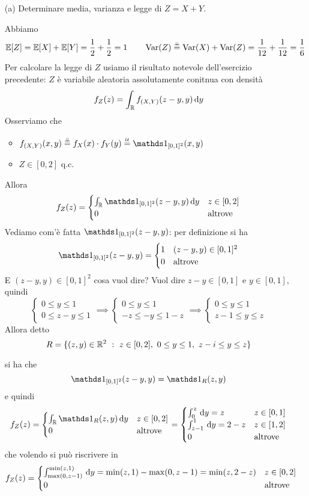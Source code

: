 \Soluzione{}
\begin{enumerate}
\item [(a)] Determinare media, varianza e legge di $Z=X+Y$.

Abbiamo
\[
\mathbb{E}[Z]=\mathbb{E}[X]+\mathbb{E}[Y]=\frac{1}{2}+\frac{1}{2}=1\qquad \operatorname{Var}(Z)\overset{\underset{\perp \!\!\! \perp}{}}{=}\operatorname{Var}(X)+\operatorname{Var}(Z)=\frac{1}{12}+\frac{1}{12}=\frac{1}{6}
\]
Per calcolare la legge di $Z$ usiamo il risultato notevole dell'esercizio precedente: $Z$ è variabile aleatoria assolutamente conitnua con densità
\[
f_Z(z)=\int_{\mathbb{R}} f_{(X,Y)}(z-y,y)\, \mathrm{d} y
\]
Osserviamo che
\begin{itemize}
\item $\fXYxy\overset{\underset{\indep}{}}{=}f_X(x)\cdot f_Y(y)\overset{\underset{\Uc}{}}{=}\Ind_{[0,1]^2}(x,y)$
\item $Z\in[0,2]$ q.c.
\end{itemize}
Allora
\[
f_Z(z)=
\begin{cases}
\int_\RR\Ind_{[0,1]^2}(z-y,y)\dy &z\in[0,2] \\
0 &\text{altrove}
\end{cases}
\]
Vediamo com'è fatta $\Ind_{[0,1]^2}(z-y,y)$: per definizione si ha
\[
\Ind_{[0,1]^2}(z-y,y)=
\begin{cases}
1 &(z-y,y)\in[0,1]^2 \\
0 &\text{altrove}
\end{cases}
\]
E $(z-y,y)\in[0,1]^2$ cosa vuol dire? Vuol dire $z-y\in[0,1]$ e $y\in[0,1]$, quindi
\[
\begin{cases}
0\leq y\leq 1 \\
0\leq z-y \leq 1
\end{cases}
\implies
\begin{cases}
0\leq y\leq 1 \\
-z\leq -y \leq 1-z
\end{cases}
\implies
\begin{cases}
0\leq y\leq 1 \\
z-1\leq y \leq z
\end{cases}
\]
Allora detto 
\[
R=\{(z,y)\in\RR^2\ :\ z\in[0,2],\ 0\leq y\leq 1,\ z-i\leq y\leq z  \}
\]


si ha che
\[
\Ind_{[0,1]^2}(z-y,y)=\Ind_R(z,y)
\]
e quindi
\[
f_Z(z)=
\begin{cases}
\int_\RR\Ind_R(z,y)\dy &z\in[0,2] \\
0 &\text{altrove}
\end{cases}
=
\begin{cases}
\int_0^z\dy=z &z\in[0,1] \\
\int_{z-1}^1\dy=2-z  &z\in[1,2] \\
0 &\text{altrove}
\end{cases}
\]
che volendo si può riscrivere in
\[
f_Z(z)=
\begin{cases}
\int_{\max(0,z-1)}^{\min(z,1)}\, \mathrm{d} y=\min(z,1)-\max(0,z-1)=\min(z,2-z) &z\in[0,2] \\
0 &\text{altrove}
\end{cases}
\]


\end{enumerate}
